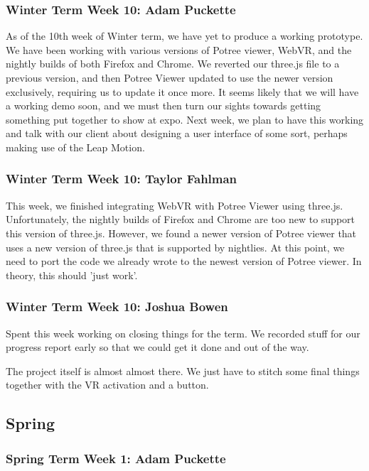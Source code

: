 \documentclass[draftclsnofoot,onecolumn]{IEEEtran}
\begin{document}
\subsubsection{Winter Term Week 10: Adam Puckette}

As of the 10th week of Winter term, we have yet to produce a working prototype. We have been working with various versions of Potree viewer, WebVR, and the nightly builds of both Firefox and Chrome. We reverted our three.js file to a previous version, and then Potree Viewer updated to use the newer version exclusively, requiring us to update it once more. It seems likely that we will have a working demo soon, and we must then turn our sights towards getting something put together to show at expo. Next week, we plan to have this working and talk with our client about designing a user interface of some sort, perhaps making use of the Leap Motion.

\subsubsection{Winter Term Week 10: Taylor Fahlman}

This week, we finished integrating WebVR with Potree Viewer using three.js. Unfortunately, the nightly builds of Firefox and Chrome are too new to support this version of three.js. However, we found a newer version of Potree viewer that uses a new version of three.js that is supported by nightlies. At this point, we need to port the code we already wrote to the newest version of Potree viewer. In theory, this should 'just work'.

\subsubsection{Winter Term Week 10: Joshua Bowen}

Spent this week working on closing things for the term. We recorded stuff for our progress report early so that we could get it done and out of the way.

The project itself is almost almost there. We just have to stitch some final things together with the VR activation and a button.

\subsection{Spring}

\subsubsection{Spring Term Week 1: Adam Puckette}
\end{document}
